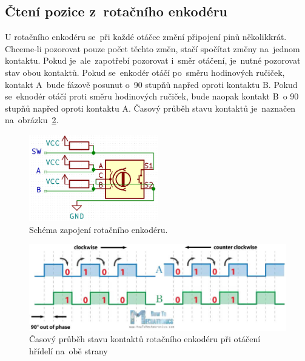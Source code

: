 

\subsection{Čtení pozice z~rotačního enkodéru}
U rotačního enkodéru se~při každé otáčce změní připojení pinů několikkrát. Chceme-li pozorovat pouze počet těchto změn, stačí spočítat změny na~jednom kontaktu. Pokud je~ale~zapotřebí pozorovat i~směr otáčení, je~nutné pozorovat stav obou kontaktů. Pokud se~enkodér otáčí po~směru hodinových ručiček, kontakt A~bude fázově posunut o~90 stupňů napřed oproti kontaktu B.
Pokud se~eknodér otáčí proti směru hodinových ručiček, bude naopak kontakt B~o 90 stupňů napřed oproti kontaktu A. Časový průběh stavu kontaktů je~naznačen na~obrázku~\ref{fig:encoder_data}.
\begin{figure}[htb]
  \centering
  \includegraphics[width=0.5\textwidth]{img/encoder-pinout.jpg}
  \caption{\label{fig:encoder-pinout} Schéma zapojení rotačního enkodéru.}
\end{figure}
\begin{figure}[htb]
  \centering
  \includegraphics[width=1\textwidth]{img/encoder_data.jpg}
  \centering
  \caption{\label{fig:encoder_data} Časový průběh stavu kontaktů rotačního enkodéru při otáčení hřídelí na~obě strany}
\end{figure}

